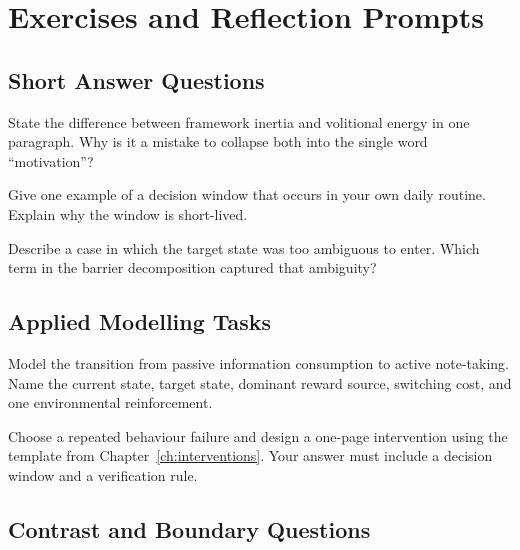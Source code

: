 \chapter{Exercises and Reflection Prompts}
\label{ch:exercises}

\section{Short Answer Questions}

\begin{exercisebox}
\begin{exercise}
State the difference between framework inertia and volitional energy in one
paragraph. Why is it a mistake to collapse both into the single word
``motivation''?
\end{exercise}

\begin{exercise}
Give one example of a decision window that occurs in your own daily routine.
Explain why the window is short-lived.
\end{exercise}

\begin{exercise}
Describe a case in which the target state was too ambiguous to enter. Which
term in the barrier decomposition captured that ambiguity?
\end{exercise}
\end{exercisebox}

\section{Applied Modelling Tasks}

\begin{exercisebox}
\begin{exercise}
Model the transition from passive information consumption to active note-taking.
Name the current state, target state, dominant reward source, switching cost,
and one environmental reinforcement.
\end{exercise}

\begin{exercise}
Choose a repeated behaviour failure and design a one-page intervention using
the template from Chapter~\ref{ch:interventions}. Your answer must include a
decision window and a verification rule.
\end{exercise}
\end{exercisebox}

\section{Contrast and Boundary Questions}

